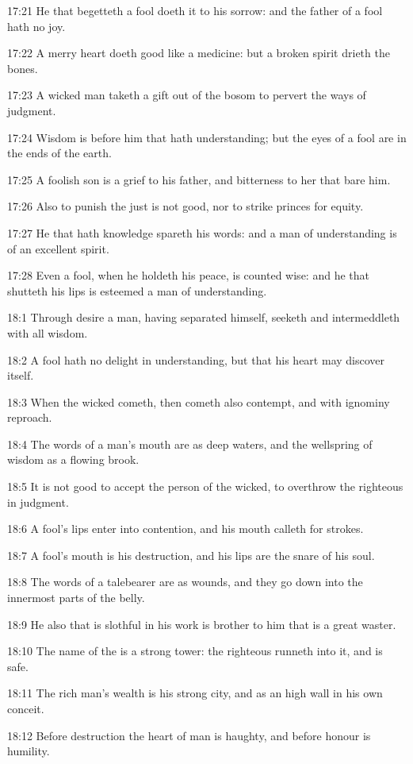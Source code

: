 17:21 He that begetteth a fool doeth it to his sorrow: and the father
of a fool hath no joy.

17:22 A merry heart doeth good like a medicine: but a broken spirit
drieth the bones.

17:23 A wicked man taketh a gift out of the bosom to pervert the ways
of judgment.

17:24 Wisdom is before him that hath understanding; but the eyes of a
fool are in the ends of the earth.

17:25 A foolish son is a grief to his father, and bitterness to her
that bare him.

17:26 Also to punish the just is not good, nor to strike princes for
equity.

17:27 He that hath knowledge spareth his words: and a man of
understanding is of an excellent spirit.

17:28 Even a fool, when he holdeth his peace, is counted wise: and he
that shutteth his lips is esteemed a man of understanding.

18:1 Through desire a man, having separated himself, seeketh and
intermeddleth with all wisdom.

18:2 A fool hath no delight in understanding, but that his heart may
discover itself.

18:3 When the wicked cometh, then cometh also contempt, and with
ignominy reproach.

18:4 The words of a man's mouth are as deep waters, and the wellspring
of wisdom as a flowing brook.

18:5 It is not good to accept the person of the wicked, to overthrow
the righteous in judgment.

18:6 A fool's lips enter into contention, and his mouth calleth for
strokes.

18:7 A fool's mouth is his destruction, and his lips are the snare of
his soul.

18:8 The words of a talebearer are as wounds, and they go down into
the innermost parts of the belly.

18:9 He also that is slothful in his work is brother to him that is a
great waster.

18:10 The name of the \LORD is a strong tower: the righteous runneth
into it, and is safe.

18:11 The rich man's wealth is his strong city, and as an high wall in
his own conceit.

18:12 Before destruction the heart of man is haughty, and before
honour is humility.


